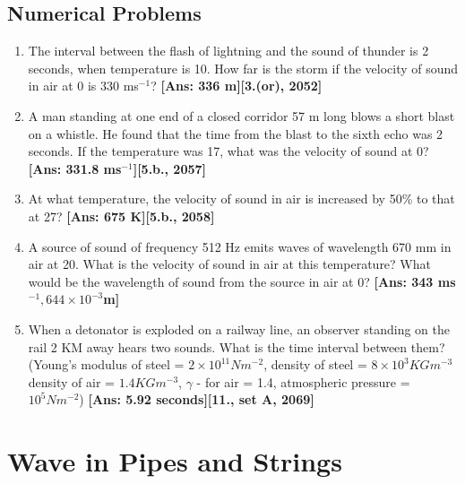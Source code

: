 \documentclass[a4paper,10pt]{report}
\begin{document}
 \subsection{Numerical Problems}
  \begin{enumerate}
   \item The interval between the flash of lightning and the sound of thunder is 2 seconds, when temperature 
    is 10\textcelsius{}. How far is the storm if the velocity of sound in air at 0\textcelsius{} is 330 ms$^{-1}$?
    \textbf{[Ans: 336 m][3.(or), 2052]}
   \item A man standing at one end of a closed corridor 57 m long blows a short blast on a whistle. 
    He found that the time from the blast to the sixth echo was 2 seconds. If the temperature was 17\textcelsius{}, 
    what was the velocity of sound at 0\textcelsius{}? \textbf{[Ans: 331.8 ms$^{-1}$][5.b., 2057]}
   \item At what temperature, the velocity of sound in air is increased by 50\%{} to that at 27\textcelsius{}?
    \textbf{[Ans: 675 K][5.b., 2058]}
   \item A source of sound of frequency 512 Hz emits waves of wavelength 670 mm in air at 20\textcelsius{}. What is 
    the velocity of sound in air at this temperature? What would be the wavelength of sound from the source in air 
    at 0\textcelsius{}? \textbf{[Ans: 343 ms$^{-1}, 644\times10^{-3}$m]}
   \item When a detonator is exploded on a railway line, an observer standing on the rail 2 KM away hears two sounds. 
    What is the time interval between them? (Young's modulus of steel = $2\times10^{11} Nm^{-2}$, density of steel =
    $8\times10^{3} KG m^{-3}$ density of air = $1.4 KG m^{-3}$, $\gamma$ - for air = 1.4, atmospheric pressure = 
    $10^5 Nm^{-2}$) \textbf{[Ans: 5.92 seconds][11., set A, 2069]}
  \end{enumerate}

\section{Wave in Pipes and Strings}
\end{document}
